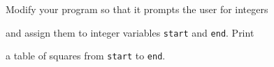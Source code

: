 Modify your program so that it prompts the user for integers

and assign them to integer variables \texttt{start} and \texttt{end}. Print

a table of squares from \texttt{start} to \texttt{end}.

